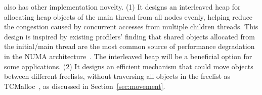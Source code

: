 

\NM{} also has other implementation novelty. 
(1) It designs an interleaved heap for allocating heap objects of the main thread from all nodes evenly, helping reduce the congestion caused by concurrent accesses from multiple children threads. This design is inspired by existing profilers' finding that shared objects allocated from the initial/main thread are the most common source of performance degradation in the NUMA architecture~\cite{XuNuma, MemProf}. The interleaved heap will be a beneficial option for some applications. (2) It designs an efficient mechanism that could move objects between different freelists, without traversing all objects in the freelist as TCMalloc~\cite{tcmalloc}, as discussed in Section~\ref{sec:movement}. 



